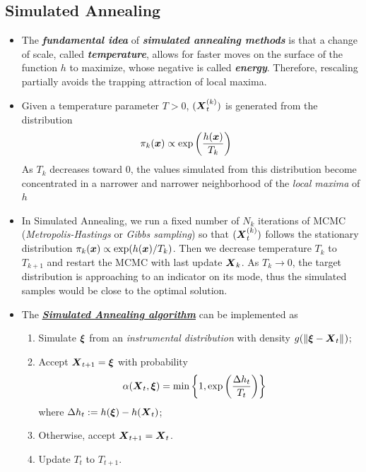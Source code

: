 \documentclass[11pt]{article}
\begin{document}
\subsection{Simulated Annealing}
\begin{itemize}
\item The \emph{\textbf{fundamental idea}} of \emph{\textbf{simulated annealing methods}} is that a change of scale, called \emph{\textbf{temperature}}, allows for faster moves on the surface of the function $h$ to maximize, whose negative is called \emph{\textbf{energy}}. Therefore, rescaling partially avoids the trapping attraction of local maxima.

\item Given a temperature parameter $T > 0$, $(\boldsymbol{X}_{t}^{(k)})$ is generated from the distribution
\begin{align}
\pi_{k}(\boldsymbol{x}) &\propto \exp\left(\frac{h(\boldsymbol{x})}{T_{k}}\right)
\end{align} As $T_{k}$ decreases toward $0$, the values simulated from this distribution become concentrated in a narrower and narrower neighborhood of the \emph{local maxima} of $h$

\item In Simulated Annealing, we run a fixed number of $N_k$ iterations of MCMC (\emph{Metropolis-Hastings} or \emph{Gibbs sampling}) so that $(\boldsymbol{X}_t^{(k)})$ follows the stationary distribution $\pi_k(\boldsymbol{x}) \propto \exp(h(\boldsymbol{x})/T_{k})$. Then we decrease temperature $T_{k}$ to $T_{k+1}$ and restart the MCMC with last update $\boldsymbol{X}_{k}$. As $T_{k}\rightarrow 0$, the target distribution is approaching to an indicator on its mode, thus the simulated samples would be close to the optimal solution.


\item The \underline{\emph{\textbf{Simulated Annealing algorithm}}} can be implemented as 
\begin{enumerate}
\item Simulate $\boldsymbol{\xi}$ from an \emph{instrumental distribution} with density $g(\left\|\boldsymbol{\xi} - \boldsymbol{X}_{t}\right\|_{})$;
\item Accept $\boldsymbol{X}_{t+1} = \boldsymbol{\xi}$ with probability
\begin{align*}
\alpha(\boldsymbol{X}_t, \boldsymbol{\xi})&= \min\left\{1, \exp\left(\frac{\Delta h_{t}}{T_{t}}\right)\right\}
\end{align*} where $\Delta h_t := h(\boldsymbol{\xi}) - h(\boldsymbol{X}_t)$;
\item Otherwise, accept $\boldsymbol{X}_{t+1} = \boldsymbol{X}_t$.
\item Update $T_{t}$ to $T_{t+1}$.
\end{enumerate}


\end{itemize}
\end{document}
